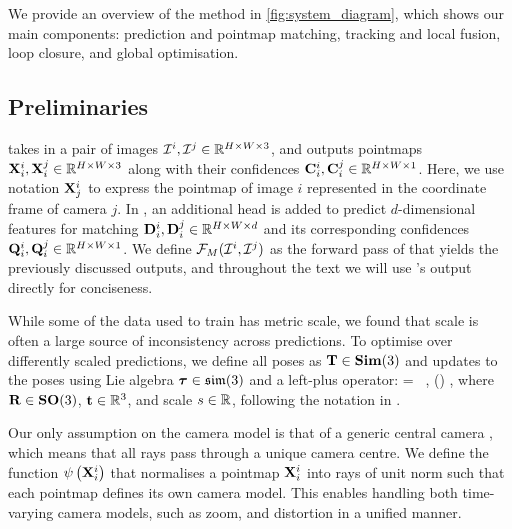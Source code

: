 \documentclass[10pt,twocolumn,letterpaper]{article}
\begin{document}
We provide an overview of the method in \cref{fig:system_diagram}, which shows our main components: \master prediction and pointmap matching, tracking and local fusion, loop closure, and global optimisation.

\subsection{Preliminaries}
\duster takes in a pair of images $\mathcal{I}^i, \mathcal{I}^j \in \mathbb{R}^{H\times W\times3}$, and outputs pointmaps ${{\mathbf X}}^i_{i}, {{\mathbf X}}^j_{i} \in \mathbb{R}^{H\times W\times3}$ along with their confidences ${{\mathbf C}}^i_{i}, {{\mathbf C}}^j_{i} \in \mathbb{R}^{H\times W\times1}$. Here, we use notation ${{\mathbf X}}^i_{j}$ to express the pointmap of image $i$ represented in the coordinate frame of camera $j$.
In \master, an additional head is added to predict $d$-dimensional features for matching ${{\mathbf D}}^i_{i}, {{\mathbf D}}^j_{i}\in \mathbb{R}^{H\times W\times d}$ and its corresponding confidences ${{\mathbf Q}}^i_{i}, {{\mathbf Q}}^j_{i}\in \mathbb{R}^{H\times W\times1}$.  We define $\mathcal{F}_{M}(\mathcal{I}^i, \mathcal{I}^j)$ as the forward pass of \master that yields the previously discussed outputs, and throughout the text we will use \master's output directly for conciseness.

While some of the data used to train \master has metric scale, we found that scale is often a large source of inconsistency across predictions.
To optimise over differently scaled predictions, we define all poses as ${{\mathbf T}} \in \mathbf{Sim}(3)$ and updates to the poses using Lie algebra ${\boldsymbol {\tau}} \in {\mathfrak{sim}(3)}$ and a left-plus operator:
%
\beq
\matT = ~, \quad
\matT \leftarrow \vectau \oplus \matT \triangleq \Exp(\vectau) \circ \matT,
\eeq
%
where ${{\mathbf R}}\in\mathbf{SO}(3)$, ${{\mathbf {t}}} \in \mathbb{R}^3$, and scale $s \in \mathbb{R}$, following the notation in \cite{sola_micro_2018, teed2021tangent}.

Our only assumption on the camera model is that of a generic central camera \cite{schops_why_2020}, which means that all rays pass through a unique camera centre.  We define the function $\psi\left({{\mathbf X}}^i_{i}\right)$ that normalises a pointmap ${{\mathbf X}}^i_{i}$ into rays of unit norm such that each pointmap defines its own camera model.  This enables handling both time-varying camera models, such as zoom, and distortion in a unified manner.
\end{document}
